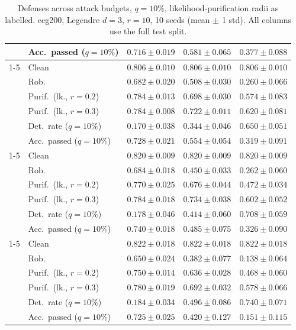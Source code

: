 \begin{table}[htbp]
\begin{tabular}{@{}llrrr@{}}
     & Acc.\ passed ($q{=}10\%$) & $0.716 \pm 0.019$ & $\mathbf{0.581 \pm 0.065}$ & $\mathbf{0.377 \pm 0.088}$ \\
    \cmidrule(lr){1-5}
    \multirow{6}{*}{$\alpha{=}0.2$} & Clean & $0.806 \pm 0.010$ & $0.806 \pm 0.010$ & $0.806 \pm 0.010$ \\
     & Rob. & $0.682 \pm 0.020$ & $0.508 \pm 0.030$ & $0.260 \pm 0.066$ \\
     & Purif.\ (lk., $r{=}0.2$) & $\mathbf{0.784 \pm 0.013}$ & $\mathbf{0.698 \pm 0.030}$ & $0.574 \pm 0.083$ \\
     & Purif.\ (lk., $r{=}0.3$) & $0.784 \pm 0.008$ & $0.722 \pm 0.011$ & $0.620 \pm 0.081$ \\
     & Det.\ rate ($q{=}10\%$) & $0.170 \pm 0.038$ & $0.344 \pm 0.046$ & $0.650 \pm 0.051$ \\
     & Acc.\ passed ($q{=}10\%$) & $0.728 \pm 0.021$ & $0.554 \pm 0.054$ & $0.319 \pm 0.091$ \\
    \cmidrule(lr){1-5}
    \multirow{6}{*}{$\alpha{=}0.5$} & Clean & $0.820 \pm 0.009$ & $0.820 \pm 0.009$ & $0.820 \pm 0.009$ \\
     & Rob. & $\mathbf{0.684 \pm 0.018}$ & $0.450 \pm 0.033$ & $0.262 \pm 0.060$ \\
     & Purif.\ (lk., $r{=}0.2$) & $0.770 \pm 0.025$ & $0.676 \pm 0.044$ & $0.472 \pm 0.034$ \\
     & Purif.\ (lk., $r{=}0.3$) & $\mathbf{0.784 \pm 0.018}$ & $\mathbf{0.734 \pm 0.038}$ & $0.602 \pm 0.052$ \\
     & Det.\ rate ($q{=}10\%$) & $0.178 \pm 0.046$ & $0.414 \pm 0.060$ & $0.708 \pm 0.059$ \\
     & Acc.\ passed ($q{=}10\%$) & $\mathbf{0.740 \pm 0.018}$ & $0.485 \pm 0.075$ & $0.326 \pm 0.090$ \\
    \cmidrule(lr){1-5}
    \multirow{6}{*}{$\alpha{=}1$} & Clean & $\mathbf{0.822 \pm 0.018}$ & $\mathbf{0.822 \pm 0.018}$ & $\mathbf{0.822 \pm 0.018}$ \\
     & Rob. & $0.650 \pm 0.024$ & $0.382 \pm 0.077$ & $0.138 \pm 0.064$ \\
     & Purif.\ (lk., $r{=}0.2$) & $0.750 \pm 0.014$ & $0.636 \pm 0.028$ & $0.468 \pm 0.060$ \\
     & Purif.\ (lk., $r{=}0.3$) & $0.780 \pm 0.019$ & $0.692 \pm 0.032$ & $0.578 \pm 0.066$ \\
     & Det.\ rate ($q{=}10\%$) & $0.184 \pm 0.034$ & $\mathbf{0.496 \pm 0.086}$ & $\mathbf{0.740 \pm 0.071}$ \\
     & Acc.\ passed ($q{=}10\%$) & $0.725 \pm 0.025$ & $0.420 \pm 0.127$ & $0.151 \pm 0.115$ \\
    \bottomrule
  \end{tabular}
  \caption{Defenses across attack budgets, $q{=}10\%$, likelihood-purification radii as labelled. ecg200, Legendre $d{=}3$, $r{=}10$, 10 seeds (mean $\pm$ 1 std). All columns use the full test split.}
  \label{tab:ecg200_models_r10}
\end{table}
